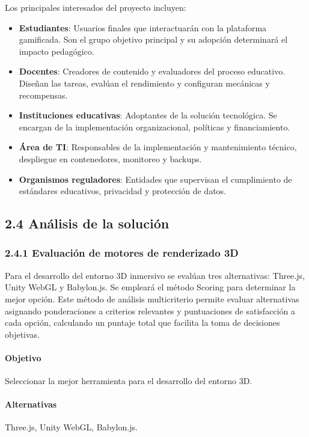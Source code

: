 Los principales interesados del proyecto incluyen:

\begin{itemize}
	\item \textbf{Estudiantes}: Usuarios finales que interactuarán con la plataforma gamificada. Son el grupo objetivo principal y su adopción determinará el impacto pedagógico.
	\item \textbf{Docentes}: Creadores de contenido y evaluadores del proceso educativo. Diseñan las tareas, evalúan el rendimiento y configuran mecánicas y recompensas.
	\item \textbf{Instituciones educativas}: Adoptantes de la solución tecnológica. Se encargan de la implementación organizacional, políticas y financiamiento.
	\item \textbf{Área de TI}: Responsables de la implementación y mantenimiento técnico, despliegue en contenedores, monitoreo y backups.
	\item \textbf{Organismos reguladores}: Entidades que supervisan el cumplimiento de estándares educativos, privacidad y protección de datos.
\end{itemize}

\subsection{2.4 Análisis de la solución}

\subsubsection{2.4.1 Evaluación de motores de renderizado 3D}
Para el desarrollo del entorno 3D inmersivo se evalúan tres alternativas: Three.js, Unity WebGL y Babylon.js. Se empleará el método Scoring \cite{belton2002} para determinar la mejor opción. Este método de análisis multicriterio permite evaluar alternativas asignando ponderaciones a criterios relevantes y puntuaciones de satisfacción a cada opción, calculando un puntaje total que facilita la toma de decisiones objetivas.

\paragraph{Objetivo}
Seleccionar la mejor herramienta para el desarrollo del entorno 3D.

\paragraph{Alternativas}
Three.js, Unity WebGL, Babylon.js.

